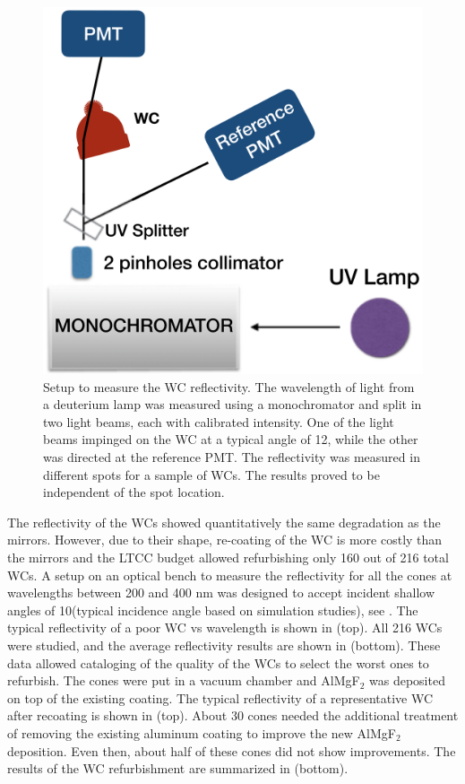 \begin{figure}
	\centering
	\includegraphics[width=0.98\columnwidth,keepaspectratio]{img/wcSetup.png}
	\caption{Setup to measure the WC reflectivity. The wavelength of light from a deuterium lamp was measured using a monochromator and split in two
            light beams, each with calibrated intensity. One of the light beams impinged on the WC at a typical angle of 12\mdeg,
            while the other was directed at the reference PMT. The reflectivity was measured in different spots for a sample of WCs.  The results proved
            to be independent of the spot location. }
	\label{fig:wcSetup}
\end{figure}

The reflectivity of the WCs showed quantitatively the same degradation as the mirrors. However, due to their shape, re-coating of the WC is more costly
than the mirrors and the LTCC budget allowed refurbishing only 160 out of 216 total WCs.
A setup on an optical bench to measure the reflectivity for all the cones at wavelengths between 200 and 400 nm was designed to
accept incident shallow angles of 10\mdeg (typical incidence angle based on simulation studies), see .
The typical reflectivity of a poor WC vs wavelength is shown in  (top).
All 216 WCs were studied, and the average reflectivity results are shown in  (bottom).
These data allowed cataloging of the quality of the WCs to select the worst ones to refurbish.
The cones were put in a vacuum chamber and AlMgF$_2$ was deposited on top of the existing coating.
The typical reflectivity of a representative WC after recoating is shown in  (top).
About 30 cones needed the additional treatment of removing the existing aluminum coating to improve the new AlMgF$_2$ deposition.
Even then, about half of these cones did not show improvements.
The results of the WC refurbishment are summarized in  (bottom).


